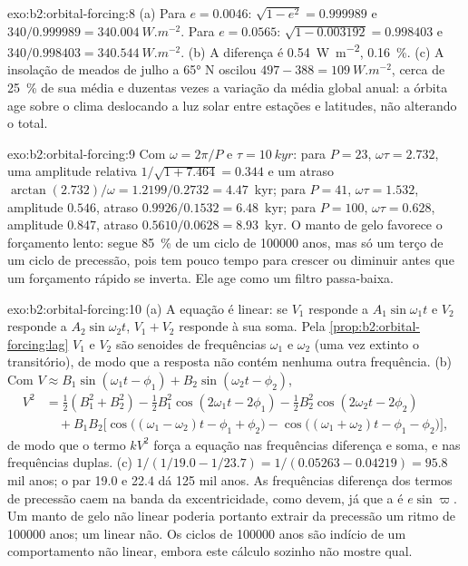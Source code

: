 \begin{solution}{exo:b2:orbital-forcing:8}
(a) Para $e = 0.0046$: $\sqrt{1 - e^2} = 0.999989$ e $340/0.999989 = \qty{340.004}{W.m^{-2}}$. Para
$e = 0.0565$: $\sqrt{1 - 0.003192} = 0.998403$ e $340/0.998403 = \qty{340.544}{W.m^{-2}}$. (b) A
diferença é \qty{0.54}{W.m^{-2}}, \qty{0.16}{\percent}. (c) A insolação de meados de julho a \ang{65} N
oscilou $497 - 388 = \qty{109}{W.m^{-2}}$, cerca de \qty{25}{\percent} de sua média e duzentas
vezes a variação da média global anual: a órbita age sobre o clima deslocando a luz solar entre
estações e latitudes, não alterando o total.
\end{solution}

\begin{solution}{exo:b2:orbital-forcing:9}
Com $\omega = 2\pi/P$ e $\tau = \qty{10}{kyr}$: para $P = 23$, $\omega\tau = 2.732$, uma amplitude
relativa $1/\sqrt{1 + 7.464} = 0.344$ e um atraso $\arctan(2.732)/\omega = 1.2199/0.2732 = 4.47$~kyr;
para $P = 41$, $\omega\tau = 1.532$, amplitude $0.546$, atraso $0.9926/0.1532 = 6.48$~kyr; para $P =
100$, $\omega\tau = 0.628$, amplitude $0.847$, atraso $0.5610/0.0628 = 8.93$~kyr. O manto de gelo
favorece o forçamento lento: segue \qty{85}{\percent} de um ciclo de \num{100000} anos, mas só um
terço de um ciclo de precessão, pois tem pouco tempo para crescer ou diminuir antes que um forçamento rápido
se inverta. Ele age como um filtro passa-baixa.
\end{solution}

\begin{solution}{exo:b2:orbital-forcing:10}
(a) A equação é linear: se $V_1$ responde a $A_1\sin\omega_1t$ e $V_2$ responde a
$A_2\sin\omega_2t$, $V_1 + V_2$ responde à sua soma. Pela \cref{prop:b2:orbital-forcing:lag} $V_1$ e
$V_2$ são senoides de frequências $\omega_1$ e $\omega_2$ (uma vez extinto o transitório), de modo que
a resposta não contém nenhuma outra frequência. (b) Com $V \approx B_1\sin(\omega_1t - \phi_1) +
B_2\sin(\omega_2t - \phi_2)$,
\[
\begin{aligned}
  V^2 &= \tfrac12(B_1^2 + B_2^2) - \tfrac12B_1^2\cos(2\omega_1t - 2\phi_1) -
  \tfrac12B_2^2\cos(2\omega_2t - 2\phi_2)\\
  &\quad + B_1B_2\bigl[\cos\bigl((\omega_1 - \omega_2)t - \phi_1 + \phi_2\bigr) -
  \cos\bigl((\omega_1 + \omega_2)t - \phi_1 - \phi_2\bigr)\bigr],
\end{aligned}
\]
de modo que o termo $kV^2$ força a equação nas frequências diferença e soma, e nas frequências
duplas. (c) $1/(1/19.0 - 1/23.7) = 1/(0.05263 - 0.04219) = 95.8$ mil anos; o par 19.0
e 22.4 dá 125 mil anos. As frequências diferença dos termos de precessão caem na banda da
excentricidade, como devem, já que a  é $e\sin\varpi$. Um manto de gelo
não linear poderia portanto extrair da precessão um ritmo de \num{100000} anos; um linear
não. Os ciclos de \num{100000} anos são indício de um comportamento não linear, embora este cálculo
sozinho não mostre qual.
\end{solution}

